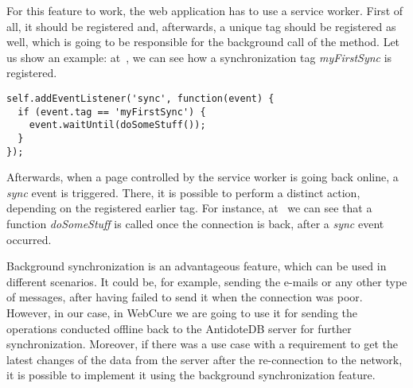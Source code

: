 For this feature to work, the web application has to use a service worker. First of all, it should be registered and, afterwards, a unique tag should be registered as well, which is going to be responsible for the background call of the method. Let us show an example: at~, we can see how a synchronization tag \textit{myFirstSync} is registered.

\begin{lstlisting}[caption={An example code, which demonstates that a function \textit{doSomeStuff} called, when the \textit{sync} event happened\cite{38}.}, label={lst:tech9}]
self.addEventListener('sync', function(event) {
  if (event.tag == 'myFirstSync') {
    event.waitUntil(doSomeStuff());
  }
});
\end{lstlisting} 

Afterwards, when a page controlled by the service worker is going back online, a \textit{sync} event is triggered. There, it is possible to perform a distinct action, depending on the registered earlier tag. For instance, at~ we can see that a function \textit{doSomeStuff} is called once the connection is back, after a \textit{sync} event occurred. 

Background synchronization is an advantageous feature, which can be used in different scenarios. It could be, for example, sending the e-mails or any other type of messages, after having failed to send it when the connection was poor. However, in our case, in WebCure we are going to use it for sending the operations conducted offline back to the AntidoteDB server for further synchronization. Moreover, if there was a use case with a requirement to get the latest changes of the data from the server after the re-connection to the network, it is possible to implement it using the background synchronization feature.
